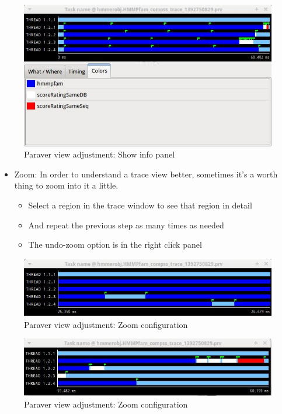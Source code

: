 \begin{figure}[ht!]
  \centering
    \includegraphics[width=1.0\textwidth]{./Sections/3_Visualization/Figures/5.jpeg}
    \caption{Paraver view adjustment: Show info panel}
\end{figure}

\begin{itemize}
 \item Zoom: In order to understand a trace view better, sometimes it’s a worth thing to zoom into it a little.
	\begin{itemize}
	    \item Select a region in the trace window to see that region in detail
	    \item And repeat the previous step as many times as needed
	    \item The undo-zoom option is in the right click panel
	\end{itemize}
\end{itemize}

\begin{figure}[ht!]
  \centering
    \includegraphics[width=1.0\textwidth]{./Sections/3_Visualization/Figures/6.jpeg}
    \caption{Paraver view adjustment: Zoom configuration}
\end{figure}

\begin{figure}[ht!]
  \centering
    \includegraphics[width=1.0\textwidth]{./Sections/3_Visualization/Figures/6_2.jpeg}
    \caption{Paraver view adjustment: Zoom configuration}
\end{figure}
